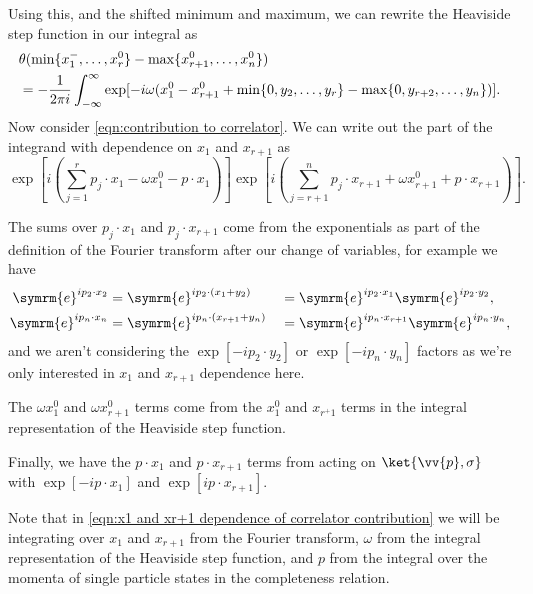 \documentclass[fleqn]{NotesClass}
\newcommand{\e}{\symrm{e}}
\newcommand{\heaviside}{\theta}
\begin{document}
    Using this, and the shifted minimum and maximum, we can rewrite the Heaviside step function in our integral as
    \begin{align}
        &\heaviside(\min\{x_1^-, \dotsc, x_r^0\} - \max\{x_{r+1}^0, \dotsc, x_n^0\})\\
        &= -\frac{1}{2\pi i}\int_{-\infty}^{\infty} \exp[-i\omega(x_1^0 - x_{r+1}^0 + \min\{0, y_2, \dotsc, y_r\} - \max\{0, y_{r+2}, \dotsc, y_n\})]. \notag
    \end{align}
    Now consider \cref{eqn:contribution to correlator}.
    We can write out the part of the integrand with dependence on \(x_1\) and \(x_{r+1}\) as
    \begin{equation*}\label{eqn:x1 and xr+1 dependence of correlator contribution}
        \exp\left[ i\left( \sum_{j = 1}^{r} p_j \cdot x_1 - \omega x_1^0 - p \cdot x_1 \right) \right] \exp\left[ i\left( \sum_{j=r+1}^{n} p_j \cdot x_{r+1} + \omega x_{r+1}^0 + p \cdot x_{r+1} \right) \right].
    \end{equation*}
    
    The sums over \(p_j \cdot x_1\) and \(p_j\cdot x_{r+1}\) come from the exponentials as part of the definition of the Fourier transform after our change of variables, for example we have
    \begin{alignat}{2}
        \e^{ip_2 \cdot x_2} &= \e^{ip_2\cdot(x_1 + y_2)} &&= \e^{ip_2\cdot x_1} \e^{ip_2 \cdot y_2},\\
        \e^{ip_n \cdot x_n} &= \e^{ip_n\cdot(x_{r+1} + y_n)} &&= \e^{ip_n\cdot x_{r+1}} \e^{ip_n \cdot y_n},
    \end{alignat}
    and we aren't considering the \(\exp[-ip_2 \cdot y_2]\) or \(\exp[-ip_n \cdot y_n]\) factors as we're only interested in \(x_1\) and \(x_{r+1}\) dependence here.
    
    The \(\omega x_1^0\) and \(\omega x_{r+1}^0\) terms come from the \(x_1^0\) and \(x_{r^+1}\) terms in the integral representation of the Heaviside step function.
    
    Finally, we have the \(p \cdot x_1\) and \(p \cdot x_{r+1}\) terms from acting on \(\ket{\vv{p}, \sigma}\) with \(\exp[-ip\cdot x_1]\) and \(\exp[ip\cdot x_{r+1}]\).
    
    Note that in \cref{eqn:x1 and xr+1 dependence of correlator contribution} we will be integrating over \(x_1\) and \(x_{r + 1}\) from the Fourier transform, \(\omega\) from the integral representation of the Heaviside step function, and \(p\) from the integral over the momenta of single particle states in the completeness relation.
    
\end{document}
